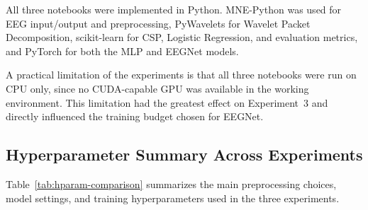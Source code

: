 \documentclass[11pt,a4paper]{article}
\begin{document}
All three notebooks were implemented in Python. MNE-Python \cite{gramfort2013mne} was used for EEG
input/output and preprocessing, PyWavelets for Wavelet Packet Decomposition, scikit-learn for CSP,
Logistic Regression, and evaluation metrics, and PyTorch \cite{paszke2019pytorch} for both the MLP
and EEGNet models.

A practical limitation of the experiments is that all three notebooks were run on CPU only, since
no CUDA-capable GPU was available in the working environment. This limitation had the greatest
effect on Experiment~3 and directly influenced the training budget chosen for EEGNet.

\subsection{Hyperparameter Summary Across Experiments}

Table~\ref{tab:hparam-comparison} summarizes the main preprocessing choices, model settings, and
training hyperparameters used in the three experiments.
\end{document}
